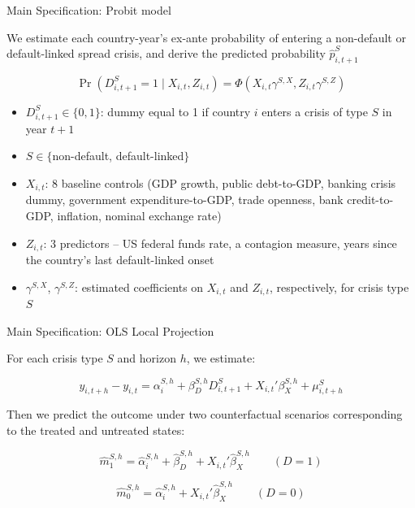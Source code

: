 \documentclass[aspectratio=169]{beamer}
\begin{document}
\begin{frame}{Main Specification: Probit model}
  \footnotesize

   We estimate each country-year's ex-ante probability of entering a
  non-default or default-linked spread crisis, and derive the
  predicted probability $\widehat{p}_{i,t+1}^S$
    \vspace{0.2em}

  \begin{equation}
  \Pr\!\left(D_{i,t+1}^S = 1 \mid X_{i,t}, Z_{i,t}\right) = \Phi\!\left(X_{i,t}\gamma^{S,X}, Z_{i,t}\gamma^{S,Z}\right)
  \end{equation}
  \vspace{-0.2em}
  \begin{itemize}
    \item $D_{i,t+1}^S \in \{0,1\}$: dummy equal to 1 if country $i$
    enters a crisis of type $S$ in year $t+1$
    \item $S \in \{$non-default, default-linked$\}$


    \item $X_{i,t}$: 8 baseline controls (GDP growth, public
    debt-to-GDP, banking crisis dummy, government expenditure-to-GDP,
    trade openness, bank credit-to-GDP, inflation, nominal exchange
    rate)
    \item $Z_{i,t}$: 3 predictors -- US federal funds rate, a
    contagion measure, years since the country's last default-linked
    onset
    \item $\gamma^{S,X}$, $\gamma^{S,Z}$: estimated coefficients on
    $X_{i,t}$ and $Z_{i,t}$, respectively, for crisis type $S$
  \end{itemize}
\end{frame}




\begin{frame}{Main Specification: OLS Local Projection}
  \footnotesize

  For each crisis type $S$ and horizon $h$, we estimate:

  \vspace{0.2em}
  \begin{equation}
  y_{i,t+h} - y_{i,t}
  =
  \alpha_i^{S,h}
  + \beta_D^{S,h} D_{i,t+1}^{S}
  + X_{i,t}'\beta_X^{S,h}
  + \mu_{i,t+h}^{S}
  \end{equation}
  \vspace{-0.2em}


 Then we predict the outcome under two counterfactual scenarios corresponding to the treated and untreated states:


  \begin{equation}
  \widehat m_{1}^{S,h}
  =
  \widehat\alpha_i^{S,h}
  +\widehat\beta_D^{S,h}
  +X_{i,t}'\widehat\beta_X^{S,h}
  \qquad (D=1)
  \end{equation}

  \begin{equation}
  \widehat m_{0}^{S,h}
  =
  \widehat\alpha_i^{S,h}
  +X_{i,t}'\widehat\beta_X^{S,h}
  \qquad (D=0)
  \end{equation}

\end{frame}
\end{document}
